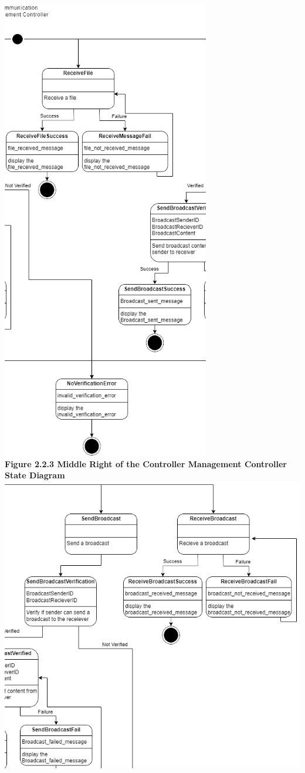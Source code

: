 \documentclass[]{article}
\begin{document}
\begin{center}
\includegraphics[height=8in]{../images/ControllerStateDiagrams/CMC3.png}\\
\textbf{Figure 2.2.3 Middle Right of the Controller Management Controller State Diagram}
\includegraphics{../images/ControllerStateDiagrams/CMC4.png}\\

\end{center}
\end{document}
